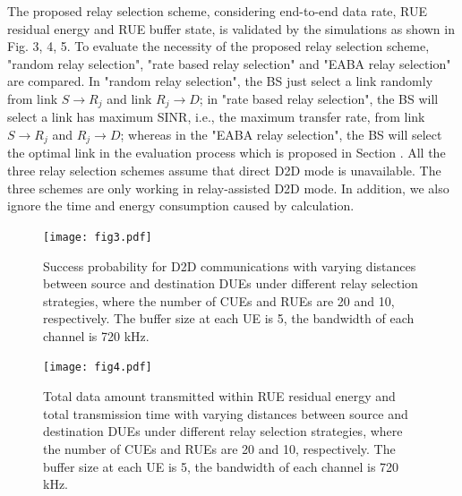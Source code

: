 \documentclass[conference]{IEEEtran}
\begin{document}
The proposed relay selection scheme, considering end-to-end data rate, RUE residual energy and RUE buffer state, is validated by the simulations as shown in Fig. 3, 4, 5. To evaluate the necessity of the proposed relay selection scheme, "random relay selection", "rate based relay selection" and "EABA relay selection" are compared. In "random relay selection", the BS just select a link randomly from link $S\rightarrow R_j$ and link $R_j\rightarrow D$; in "rate based relay selection", the BS will select a link has maximum SINR, i.e., the maximum transfer rate, from link $S\rightarrow R_j$ and $R_j\rightarrow D$; whereas in the "EABA relay selection", the BS will select the optimal link in the evaluation process which is proposed in Section \uppercase\expandafter{}. All the three relay selection schemes assume that direct D2D mode is unavailable. The three schemes are only working in relay-assisted D2D mode. In addition, we also ignore the time and energy consumption caused by  calculation.

\begin{figure}[!t]
\texttt{[image: fig3.pdf]}
\caption{Success probability for D2D communications with varying distances between source and destination DUEs under different relay selection strategies, where the number of CUEs and RUEs are 20 and 10, respectively. The buffer size at each UE is 5, the bandwidth of each channel is 720 kHz.}
\label{fig_success}
\end{figure}
\begin{figure}[!t]
\center
\texttt{[image: fig4.pdf]}
\caption{Total data amount transmitted within RUE residual energy and total transmission time with varying distances between source and destination DUEs under different relay selection strategies, where the number of CUEs and RUEs are 20 and 10, respectively. The buffer size at each UE is 5, the bandwidth of each channel is 720 kHz.}
\label{fig_time}
\end{figure}
\end{document}
